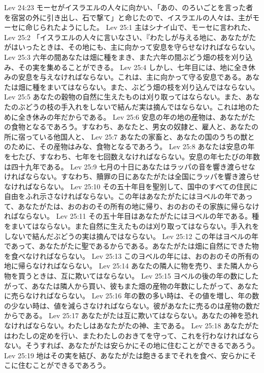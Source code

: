 Lev 24:23  モーセがイスラエルの人々に向かい、「あの、のろいごとを言った者を宿営の外に引き出し、石で撃て」と命じたので、イスラエルの人々は、主がモーセに命じられたようにした。
Lev 25:1  主はシナイ山で、モーセに言われた、
Lev 25:2  「イスラエルの人々に言いなさい、『わたしが与える地に、あなたがたがはいったときは、その地にも、主に向かって安息を守らせなければならない。
Lev 25:3  六年の間あなたは畑に種をまき、また六年の間ぶどう畑の枝を刈り込み、その実を集めることができる。
Lev 25:4  しかし、七年目には、地に全き休みの安息を与えなければならない。これは、主に向かって守る安息である。あなたは畑に種をまいてはならない。また、ぶどう畑の枝を刈り込んではならない。
Lev 25:5  あなたの穀物の自然に生えたものは刈り取ってはならない。また、あなたのぶどうの枝の手入れをしないで結んだ実は摘んではならない。これは地のために全き休みの年だからである。
Lev 25:6  安息の年の地の産物は、あなたがたの食物となるであろう。すなわち、あなたと、男女の奴隷と、雇人と、あなたの所に宿っている他国人と、
Lev 25:7  あなたの家畜と、あなたの国のうちの獣とのために、その産物はみな、食物となるであろう。
Lev 25:8  あなたは安息の年を七たび、すなわち、七年を七回数えなければならない。安息の年七たびの年数は四十九年である。
Lev 25:9  七月の十日にあなたはラッパの音を響き渡らせなければならない。すなわち、贖罪の日にあなたがたは全国にラッパを響き渡らせなければならない。
Lev 25:10  その五十年目を聖別して、国中のすべての住民に自由をふれ示さなければならない。この年はあなたがたにはヨベルの年であって、あなたがたは、おのおのその所有の地に帰り、おのおのその家族に帰らなければならない。
Lev 25:11  その五十年目はあなたがたにはヨベルの年である。種をまいてはならない。また自然に生えたものは刈り取ってはならない。手入れをしないで結んだぶどうの実は摘んではならない。
Lev 25:12  この年はヨベルの年であって、あなたがたに聖であるからである。あなたがたは畑に自然にできた物を食べなければならない。
Lev 25:13  このヨベルの年には、おのおのその所有の地に帰らなければならない。
Lev 25:14  あなたの隣人に物を売り、また隣人から物を買うときは、互に欺いてはならない。
Lev 25:15  ヨベルの後の年の数にしたがって、あなたは隣人から買い、彼もまた畑の産物の年数にしたがって、あなたに売らなければならない。
Lev 25:16  年の数の多い時は、その値を増し、年の数の少ない時は、値を減らさなければならない。彼があなたに売るのは産物の数だからである。
Lev 25:17  あなたがたは互に欺いてはならない。あなたの神を恐れなければならない。わたしはあなたがたの神、主である。
Lev 25:18  あなたがたはわたしの定めを行い、またわたしのおきてを守って、これを行わなければならない。そうすれば、あなたがたは安らかにその地に住むことができるであろう。
Lev 25:19  地はその実を結び、あなたがたは飽きるまでそれを食べ、安らかにそこに住むことができるであろう。
